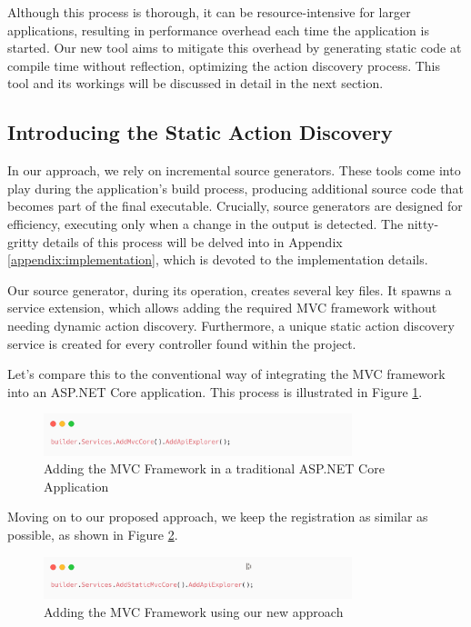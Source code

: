 Although this process is thorough, it can be resource-intensive for larger applications, resulting in performance overhead each time the application is started. Our new tool aims to mitigate this overhead by generating static code at compile time without reflection, optimizing the action discovery process. This tool and its workings will be discussed in detail in the next section.

\subsection{Introducing the Static Action Discovery}

In our approach, we rely on incremental source generators. These tools come into play during the application's build process, producing additional source code that becomes part of the final executable. Crucially, source generators are designed for efficiency, executing only when a change in the output is detected. The nitty-gritty details of this process will be delved into in Appendix \ref{appendix:implementation}, which is devoted to the implementation details.

Our source generator, during its operation, creates several key files. It spawns a service extension, which allows adding the required MVC framework without needing dynamic action discovery. Furthermore, a unique static action discovery service is created for every controller found within the project.

Let's compare this to the conventional way of integrating the MVC framework into an ASP.NET Core application. This process is illustrated in Figure \ref{fig:dynamic-action-discovery}.

\begin{figure}[H]
\centering
\includegraphics[width=0.8\textwidth]{graphics/dynamic-action-discovery.png}
\caption{Adding the MVC Framework in a traditional ASP.NET Core Application}
\label{fig:dynamic-action-discovery}
\end{figure}

Moving on to our proposed approach, we keep the registration as similar as possible, as shown in Figure \ref{fig:static-action-discovery}.

\begin{figure}[H]
\centering
\includegraphics[width=0.8\textwidth]{graphics/static-action-discovery.png}
\caption{Adding the MVC Framework using our new approach}
\label{fig:static-action-discovery}
\end{figure}

